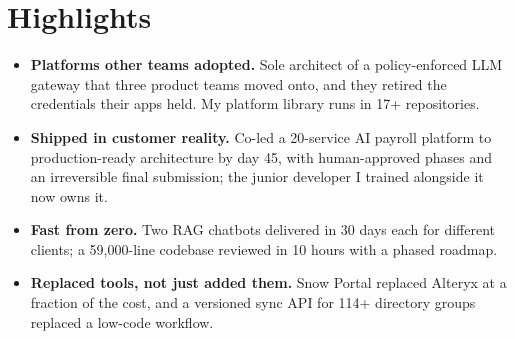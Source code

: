 \documentclass[10pt,letterpaper]{article}
\begin{document}
\section*{Highlights}
\begin{itemize}
\item \textbf{Platforms other teams adopted.} Sole architect of a policy-enforced LLM gateway that three product teams moved onto, and they retired the credentials their apps held. My platform library runs in 17+ repositories.
\item \textbf{Shipped in customer reality.} Co-led a 20-service AI payroll platform to production-ready architecture by day 45, with human-approved phases and an irreversible final submission; the junior developer I trained alongside it now owns it.
\item \textbf{Fast from zero.} Two RAG chatbots delivered in 30 days each for different clients; a 59,000-line codebase reviewed in 10 hours with a phased roadmap.
\item \textbf{Replaced tools, not just added them.} Snow Portal replaced Alteryx at a fraction of the cost, and a versioned sync API for 114+ directory groups replaced a low-code workflow.
\end{itemize}
\end{document}
